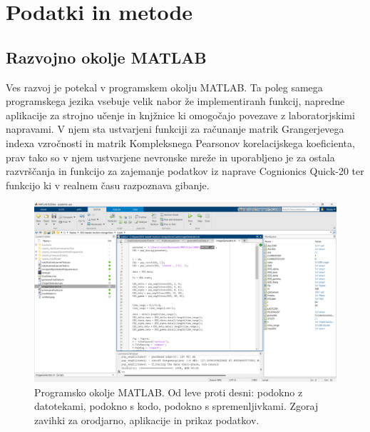 \chapter{Podatki in metode}
\section{Razvojno okolje MATLAB}
Ves razvoj je potekal v programskem okolju MATLAB. Ta poleg samega programskega jezika vsebuje velik nabor že implementiranh funkcij, napredne aplikacije za strojno učenje in knjžnice ki omogočajo povezave z laboratorjskimi napravami. V njem sta ustvarjeni funkciji za računanje matrik Grangerjevega indexa vzročnosti
in matrik Kompleksnega Pearsonov korelacijskega koeficienta, prav tako so v njem ustvarjene nevronske mreže in uporabljeno je za ostala razvrščanja in funkcijo za zajemanje podatkov iz naprave Cognionics Quick-20 ter funkcijo ki v realnem času razpoznava gibanje. \cite{MATLAB}
\begin{figure}[h!]
    \begin{center}
    \includegraphics[width=1\linewidth]{slike/Matlab.png}
    \end{center}
    \caption{Programsko okolje MATLAB. Od leve proti desni: podokno z datotekami, podokno s kodo, podokno s spremenljivkami. Zgoraj zavihki za orodjarno, aplikacije in prikaz podatkov.}
    \end{figure}
    
